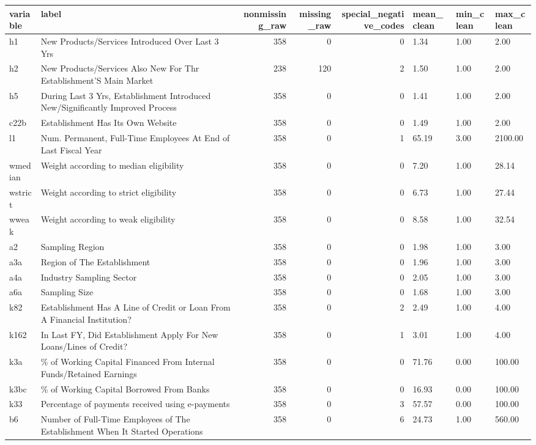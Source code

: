 \begin{tabular}{llrrrlll}
\toprule
variable & label & nonmissing\_raw & missing\_raw & special\_negative\_codes & mean\_clean & min\_clean & max\_clean \\
\midrule
h1 & New Products/Services Introduced Over Last 3 Yrs & 358 & 0 & 0 & 1.34 & 1.00 & 2.00 \\
h2 & New Products/Services Also New For Thr Establishment'S Main Market & 238 & 120 & 2 & 1.50 & 1.00 & 2.00 \\
h5 & During Last 3 Yrs, Establishment Introduced New/Significantly Improved Process & 358 & 0 & 0 & 1.41 & 1.00 & 2.00 \\
c22b & Establishment Has Its Own Website & 358 & 0 & 0 & 1.49 & 1.00 & 2.00 \\
l1 & Num. Permanent, Full-Time Employees At End of Last Fiscal Year & 358 & 0 & 1 & 65.19 & 3.00 & 2100.00 \\
wmedian & Weight according to median eligibility & 358 & 0 & 0 & 7.20 & 1.00 & 28.14 \\
wstrict & Weight according to strict eligibility & 358 & 0 & 0 & 6.73 & 1.00 & 27.44 \\
wweak & Weight according to weak eligibility & 358 & 0 & 0 & 8.58 & 1.00 & 32.54 \\
a2 & Sampling Region & 358 & 0 & 0 & 1.98 & 1.00 & 3.00 \\
a3a & Region of The Establishment & 358 & 0 & 0 & 1.96 & 1.00 & 3.00 \\
a4a & Industry Sampling Sector & 358 & 0 & 0 & 2.05 & 1.00 & 3.00 \\
a6a & Sampling Size & 358 & 0 & 0 & 1.68 & 1.00 & 3.00 \\
k82 & Establishment Has A Line of Credit or Loan From A Financial Institution? & 358 & 0 & 2 & 2.49 & 1.00 & 4.00 \\
k162 & In Last FY, Did Establishment Apply For New Loans/Lines of Credit? & 358 & 0 & 1 & 3.01 & 1.00 & 4.00 \\
k3a & \% of Working Capital Financed From Internal Funds/Retained Earnings & 358 & 0 & 0 & 71.76 & 0.00 & 100.00 \\
k3bc & \% of Working Capital Borrowed From Banks & 358 & 0 & 0 & 16.93 & 0.00 & 100.00 \\
k33 & Percentage of payments received using e-payments & 358 & 0 & 3 & 57.57 & 0.00 & 100.00 \\
b6 & Number of Full-Time Employees of The Establishment When It Started Operations & 358 & 0 & 6 & 24.73 & 1.00 & 560.00 \\
\bottomrule
\end{tabular}
